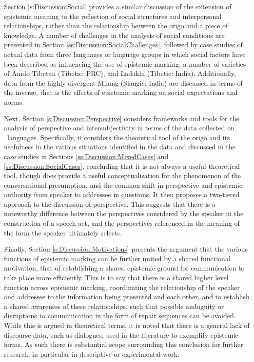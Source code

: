 Section \ref{s:Discussion:Social} provides a similar discussion of the extension of epistemic meaning to the reflection of social structures and interpersonal relationships, rather than the relationship between the origo and a piece of knowledge. A number of challenges in the analysis of social conditions are presented in Section \ref{ss:Discussion:SocialChallenges}, followed by case studies of actual data from three languages or language groups in which social factors have been described as influencing the use of epistemic marking: a number of varieties of Amdo Tibetan (Tibetic: PRC), and Ladakhi (Tibetic: India). Additionally, data from the highly divergent Milang (Siangic: India) are discussed in terms of the inverse, that is the effects of epistemic marking on social expectations and norms.

Next, Section \ref{s:Discussion:Perspective} considers frameworks and tools for the analysis of perspective and intersubjectivity in terms of the data collected on \lfam\ languages. Specifically, it considers the theoretical tool of the origo and its usefulness in the various situations identified in the data and discussed in the case studies in Sections \ref{ss:Discussion:MixedCases} and \ref{ss:Discussion:SocialCases}, concluding that it is not always a useful theoretical tool, though does provide a useful conceptualisation for the phenomenon of the conversational presumption, and the common shift in perspective and epistemic authority from speaker to addressee in questions. It then proposes a two-tiered approach to the discussion of perspective. This suggests that there is a noteworthy difference between the perspectives considered by the speaker in the construction of a speech act, and the perspectives referenced in the meaning of the form the speaker ultimately selects.

Finally, Section \ref{s:Discussion:Motivations} presents the argument that the various functions of epistemic marking can be further united by a shared functional motivation, that of establishing a shared epistemic ground for communication to take place more efficiently. This is to say that there is a shared higher level function across epistemic marking, coordinating the relationship of the speaker and addressee to the information being presented and each other, and to establish a shared awareness of these relationships, such that possible ambiguity or disruptions to communication in the form of repair sequences can be avoided. While this is argued in theoretical terms, it is noted that there is a general lack of discourse data, such as dialogues, used in the literature to exemplify epistemic forms. As such there is substantial scope surrounding this conclusion for further research, in particular in descriptive or experimental work.


